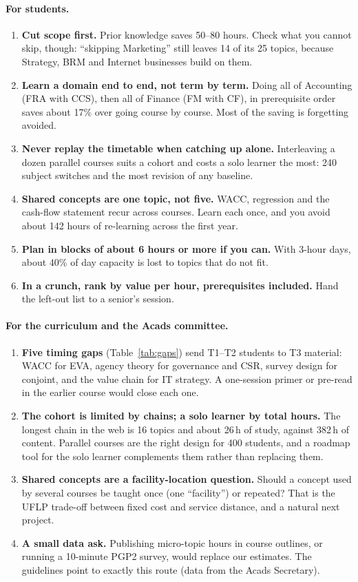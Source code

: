 \documentclass[11pt,a4paper]{article}
\begin{document}
\paragraph{For students.}
\begin{enumerate}[leftmargin=*]
\item \textbf{Cut scope first.} Prior knowledge saves 50--80 hours. Check what you cannot skip, though: ``skipping Marketing'' still leaves 14 of its 25 topics, because Strategy, BRM and Internet businesses build on them.
\item \textbf{Learn a domain end to end, not term by term.} Doing all of Accounting (FRA with CCS), then all of Finance (FM with CF), in prerequisite order saves about 17\% over going course by course. Most of the saving is forgetting avoided.
\item \textbf{Never replay the timetable when catching up alone.} Interleaving a dozen parallel courses suits a cohort and costs a solo learner the most: 240 subject switches and the most revision of any baseline.
\item \textbf{Shared concepts are one topic, not five.} WACC, regression and the cash-flow statement recur across courses. Learn each once, and you avoid about 142 hours of re-learning across the first year.
\item \textbf{Plan in blocks of about 6 hours or more if you can.} With 3-hour days, about 40\% of day capacity is lost to topics that do not fit.
\item \textbf{In a crunch, rank by value per hour, prerequisites included.} Hand the left-out list to a senior's session.
\end{enumerate}

\paragraph{For the curriculum and the Acads committee.}
\begin{enumerate}[leftmargin=*]
\item \textbf{Five timing gaps} (Table~\ref{tab:gaps}) send T1--T2 students to T3 material: WACC for EVA, agency theory for governance and CSR, survey design for conjoint, and the value chain for IT strategy. A one-session primer or pre-read in the earlier course would close each one.
\item \textbf{The cohort is limited by chains; a solo learner by total hours.} The longest chain in the web is 16 topics and about 26\,h of study, against 382\,h of content. Parallel courses are the right design for 400 students, and a roadmap tool for the solo learner complements them rather than replacing them.
\item \textbf{Shared concepts are a facility-location question.} Should a concept used by several courses be taught once (one ``facility'') or repeated? That is the UFLP trade-off between fixed cost and service distance, and a natural next project.
\item \textbf{A small data ask.} Publishing micro-topic hours in course outlines, or running a 10-minute PGP2 survey, would replace our estimates. The guidelines point to exactly this route (data from the Acads Secretary).
\end{enumerate}
\end{document}
